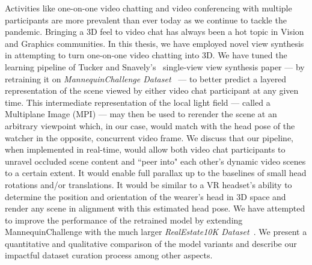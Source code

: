 Activities like one-on-one video chatting and video conferencing with multiple participants are more prevalent than ever today as we continue to tackle the pandemic. Bringing a 3D feel to video chat has always been a hot topic in Vision and Graphics communities. In this thesis, we have employed novel view synthesis in attempting to turn one-on-one video chatting into 3D. We have tuned the learning pipeline of Tucker and Snavely's~\cite{single_view_mpi} single-view view synthesis paper --- by retraining it on \textit{MannequinChallenge Dataset~\cite{li2019learning}} --- to better predict a layered representation of the scene viewed by either video chat participant at any given time. This intermediate representation of the local light field --- called a Multiplane Image (MPI) --- may then be used to rerender the scene at an arbitrary viewpoint which, in our case, would match with the head pose of the watcher in the opposite, concurrent video frame. We discuss that our pipeline, when implemented in real-time, would allow both video chat participants to unravel occluded scene content and ``peer into" each other's dynamic video scenes to a certain extent. It would enable full parallax up to the baselines of small head rotations and/or translations. It would be similar to a VR headset's ability to determine the position and orientation of the wearer's head in 3D space and render any scene in alignment with this estimated head pose. We have attempted to improve the performance of the retrained model by extending MannequinChallenge with the much larger \textit{RealEstate10K Dataset~\cite{zhou2018stereo}}. We present a quantitative and qualitative comparison of the model variants and describe our impactful dataset curation process among other aspects.